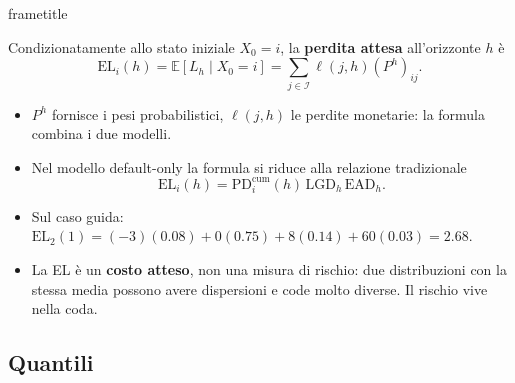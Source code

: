 \documentclass[handout]{beamer}%
\newenvironment{stepitemize}{\begin{itemize}[<+->]}{\end{itemize} }
\providecommand{\E}{\mathbb{E}}
\providecommand{\QTR}[2]{\csname #1\endcsname{#2}}
\begin{document}
\begin{frame}%

\QTR{frametitle}{Expected Loss}

%

Condizionatamente allo stato iniziale $X_0=i$, la \textbf{perdita
attesa} all'orizzonte $h$ \`{e}
\[
\mathrm{EL}_i(h)
=
\E[L_h\mid X_0=i]
=
\sum_{j\in\mathcal{I}}
\ell(j,h)(P^h)_{ij}.
\]

\medskip

\begin{stepitemize}
\item $P^h$ fornisce i pesi probabilistici, $\ell(j,h)$ le perdite
monetarie: la formula combina i due modelli.

\item Nel modello default-only la formula si riduce alla relazione
tradizionale
\[
\mathrm{EL}_i(h)
=
\mathrm{PD}_{i}^{\mathrm{cum}}(h)\,
\mathrm{LGD}_h\,
\mathrm{EAD}_h.
\]

\item Sul caso guida: $\mathrm{EL}_2(1)=(-3)(0.08)+0(0.75)
+8(0.14)+60(0.03)=2.68$.

\item La EL \`{e} un \textbf{costo atteso}, non una misura di rischio:
due distribuzioni con la stessa media possono avere dispersioni e code
molto diverse. Il rischio vive nella coda.
\end{stepitemize}

\transboxout%
\end{frame}%

\subsection{Quantili}
\end{document}
